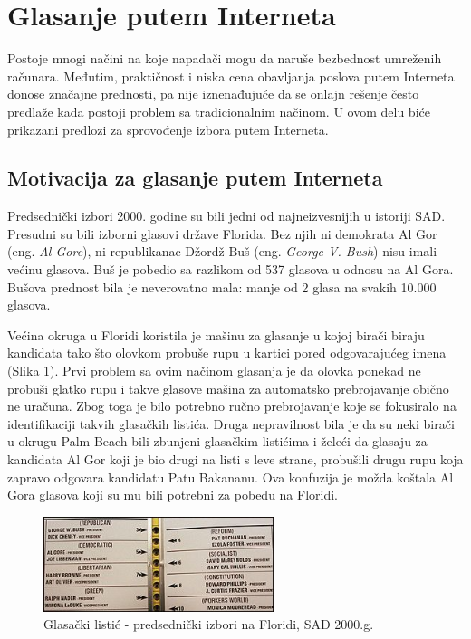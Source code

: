 \documentclass[a4paper]{article}
\theoremstyle{break}
\begin{document}
{\section{Glasanje putem Interneta}
\label{sec:glasanje}

Postoje mnogi načini na koje napadači mogu da naruše bezbednost umreženih računara. Međutim, praktičnost i niska cena obavljanja poslova putem Interneta donose značajne prednosti, pa nije iznenađujuće da se onlajn rešenje često predlaže kada postoji problem sa tradicionalnim načinom. U ovom delu biće prikazani predlozi za sprovođenje izbora putem Interneta.

\subsection{Motivacija za glasanje putem Interneta}
\label{subsec:Motivacija za glasanje putem Interneta}

Predsednički izbori 2000. godine su bili jedni od najneizvesnijih u istoriji SAD. Presudni su bili izborni glasovi države Florida. Bez njih ni demokrata Al Gor (eng. {\em Al Gore}), ni republikanac Džordž Buš (eng. {\em George V. Bush}) nisu imali većinu glasova. Buš je pobedio sa razlikom od 537 glasova u odnosu na Al Gora. Bušova prednost bila je neverovatno mala: manje od 2 glasa na svakih 10.000 glasova.

Većina okruga u Floridi koristila je mašinu za glasanje u kojoj birači biraju kandidata tako što olovkom probuše rupu u kartici pored odgovarajućeg imena (Slika \ref{fig:butterfly_ballot}). Prvi problem sa ovim načinom glasanja je da olovka ponekad ne probuši glatko rupu i takve glasove mašina za automatsko prebrojavanje obično ne uračuna. Zbog toga je bilo potrebno ručno prebrojavanje koje se fokusiralo na identifikaciji takvih glasačkih listića. Druga nepravilnost bila je da su neki birači u okrugu Palm Beach bili zbunjeni glasačkim listićima i želeći da glasaju za kandidata Al Gor koji je bio drugi na listi s leve strane, probušili drugu rupu koja zapravo odgovara kandidatu Patu Bakananu. Ova konfuzija je možda koštala Al Gora glasova koji su mu bili potrebni za pobedu na Floridi.
\begin{figure}[h!]
\begin{center}
\includegraphics[width=0.6\textwidth]{butterfly_ballot.jpg}
\end{center}
\caption{Glasački listić - predsednički izbori na Floridi, SAD 2000.g.}
\label{fig:butterfly_ballot}
\end{figure}

}
\end{document}
